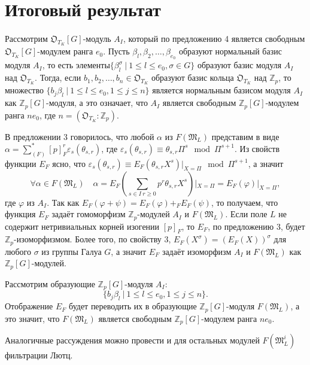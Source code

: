 \documentclass[a4paper]{article}
\newcommand{\Zp}{\mathbb{Z}_p}
\newcommand{\ML}{\mathfrak{M}_L}
\newcommand{\OTK}{\mathfrak{O}_{T_K}}
\newcommand{\Leq}{\leqslant}
\newcommand{\Geq}{\geqslant}
\begin{document}
\section{Итоговый результат}

\paragraph{}

Рассмотрим $\OTK[G]$-модуль $A_I$, который по предложению 4 является свободным $\OTK[G]$-модулем ранга $e_0$. Пусть $\beta_l,\beta_2,\dots,\beta_{e_0}$ образуют нормальный базис модуля $A_I$, то есть элементы\linebreak $\{\beta_l^\sigma\ |\ 1\Leq l\Leq e_0,\sigma\in G\}$ образуют базис модуля $A_I$ над $\OTK$. Тогда, если $b_1,b_2,\dots,b_n\in\OTK$ образуют базис кольца $\OTK$ над $\Zp$, то множество $\{b_j\beta_l\ |\ 1\Leq l\Leq e_0, 1\Leq j\Leq n\}$ является нормальным базисом модуля $A_I$ как $\Zp[G]$-модуля, а это означает, что $A_I$ является свободным $\Zp[G]$-модулем ранга $ne_0$, где $n=(\OTK:\Zp)$.

В предложении 3 говорилось, что любой $\alpha$ из $F(\ML)$ представим в виде $\alpha=\sum_{(F)}^*[p]^r_F\varepsilon_s(\theta_{s,r})$, где $\varepsilon_s(\theta_{s,r})\equiv\theta_{s,r}\Pi^{s}\mod\Pi^{s+1}$. Из свойств функции $E_F$ ясно, что $\varepsilon_s(\theta_{s,r})\equiv E_F(\theta_{s,r}X^s)|_{X=\Pi}\mod\Pi^{s+1}$, а значит
$$\forall\alpha\in F(\ML)\quad \alpha=E_F({\sum\limits_{s\in I\ r\Geq0}}p^r\theta_{s,r}X^s)|_{X=\Pi}=E_F(\varphi)|_{X=\Pi},$$
где $\varphi$ из $A_I$. Так как $E_F(\varphi+\psi)=E_F(\varphi)+_FE_F(\psi)$, то получаем, что функция $E_F$ задаёт гомоморфизм $\Zp$-модулей $A_I$ и $F(\ML)$. Если поле $L$ не содержит нетривиальных корней изогении $[p]_F$, то $E_F$, по предложению 3, будет $\Zp$-изоморфизмом. Более того, по свойству 3, $E_F(X^\sigma)=(E_F(X))^\sigma$ для любого $\sigma$ из группы Галуа $G$, а значит $E_F$ задаёт изоморфизм $A_I$ и $F(\ML)$ как $\Zp[G]$-модулей.

Рассмотрим образующие $\Zp[G]$-модуля $A_I:$
$$\{b_j\beta_l\ |\ 1\Leq l\Leq e_0, 1\Leq j\Leq n\}.$$
Отображение $E_F$ будет переводить их в образующие $\Zp[G]$-модуля $F(\ML)$, а это значит, что $F(\ML)$ является свободным $\Zp[G]$-модулем ранга $ne_0$.

Аналогичные рассуждения можно провести и для остальных модулей $F(\ML^i)$ фильтрации Лютц.
\end{document}
